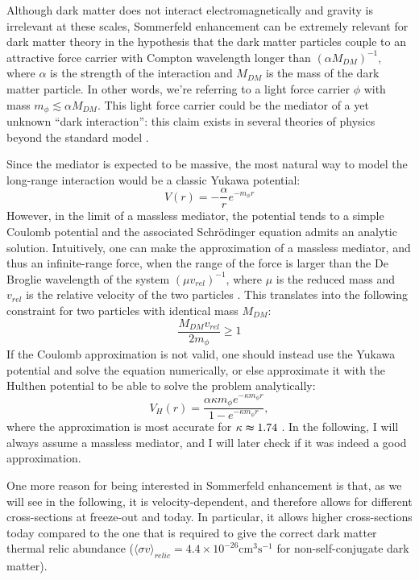 Although dark matter does not interact electromagnetically and gravity is irrelevant at these scales, Sommerfeld enhancement can be extremely relevant for dark matter theory in the hypothesis that the dark matter particles couple to an attractive force carrier with Compton wavelength longer than \((\alpha M_{DM})^{-1} \), where \(\alpha\) is the strength of the interaction and \(M_{DM} \) is the mass of the dark matter particle. In other words, we're referring to a light force carrier \(\phi \) with mass \(m_{\phi } \lesssim \alpha M_{DM} \). This light force carrier could be the mediator of a yet unknown ``dark interaction'': this claim exists in several theories of physics beyond the standard model \cite{Arkani_2009}.

Since the mediator is expected to be massive, the most natural way to model the long-range interaction would be a classic Yukawa potential:
\begin{equation}
	V(r) = -\frac{\alpha }{r} e^{-m_{\phi } r}
\end{equation}
However, in the limit of a massless mediator, the potential tends to a simple Coulomb potential and the associated Schrödinger equation admits an analytic solution. Intuitively, one can make the approximation of a massless mediator, and thus an infinite-range force, when the range of the force is larger than the De Broglie wavelength of the system \((\mu v_{rel})^{-1} \), where \(\mu \) is the reduced mass and \(v_{rel} \) is the relative velocity of the two particles \cite{Sala_2019}. This translates into the following constraint for two particles with identical mass \(M_{DM} \):
\begin{equation}
	\frac{M_{DM} v_{rel} }{2m_{\phi } }\geq 1
\end{equation}
If the Coulomb approximation is not valid, one should instead use the Yukawa potential and solve the equation numerically, or else approximate it with the Hulthen potential to be able to solve the problem analytically:
\begin{equation}\label{eq:Coulomb_approx}
	V_H(r) = \frac{\alpha \kappa m_{\phi } e^{-\kappa m_{\phi }r }}{1- e^{-\kappa m_{\phi }r }},
\end{equation}
where the approximation is most accurate for \(\kappa \thickapprox 1.74\) \cite{Cirelli_2024}. In the following, I will always assume a massless mediator, and I will later check if it was indeed a good approximation.

One more reason for being interested in Sommerfeld enhancement is that, as we will see in the following, it is velocity-dependent, and therefore allows for different cross-sections at freeze-out and today. In particular, it allows higher cross-sections today compared to the one that is required to give the correct dark matter thermal relic abundance (\(\langle \sigma v \rangle_{relic}=4.4\times 10^{-26} \mathrm{cm^3 s^{-1}}\) for non-self-conjugate dark matter).
